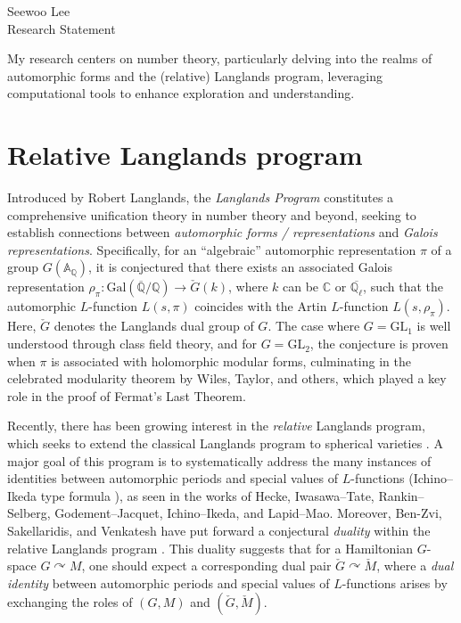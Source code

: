 \documentclass[12pt]{article}
\begin{document}
\noindent Seewoo Lee \\
Research Statement \\
\bigskip



My research centers on number theory, particularly delving into the realms of automorphic forms and the (relative) Langlands program, leveraging computational tools to enhance exploration and understanding.


\section*{Relative Langlands program}

Introduced by Robert Langlands, the \emph{Langlands Program} constitutes a comprehensive unification theory in number theory and beyond, seeking to establish connections between \emph{automorphic forms / representations} and \emph{Galois representations}.
Specifically, for an ``algebraic'' automorphic representation $\pi$ of a group $G(\mathbb{A}_{\mathbb{Q}})$, it is conjectured that there exists an associated Galois representation $\rho_{\pi}: \mathrm{Gal}(\overline{\mathbb{Q}} / \mathbb{Q}) \to \check{G}(k)$, where $k$ can be $\mathbb{C}$ or $\overline{\mathbb{Q}_{\ell}}$, such that the automorphic $L$-function $L(s, \pi)$ coincides with the Artin $L$-function $L(s, \rho_{\pi})$. Here, $\check{G}$ denotes the Langlands dual group of $G$. The case where $G = \mathrm{GL}_{1}$ is well understood through class field theory, and for $G = \mathrm{GL}_{2}$, the conjecture is proven when $\pi$ is associated with holomorphic modular forms, culminating in the celebrated modularity theorem by Wiles, Taylor, and others, which played a key role in the proof of Fermat’s Last Theorem.

Recently, there has been growing interest in the \emph{relative} Langlands program, which seeks to extend the classical Langlands program to spherical varieties \cite{sakellaridis2012spherical,sakellaridis2017periods}.
A major goal of this program is to systematically address the many instances of identities between automorphic periods and special values of $L$-functions (Ichino--Ikeda type formula \cite{ichino2010periods}), as seen in the works of Hecke, Iwasawa--Tate, Rankin--Selberg, Godement--Jacquet, Ichino--Ikeda, and Lapid--Mao. 
Moreover, Ben-Zvi, Sakellaridis, and Venkatesh have put forward a conjectural \emph{duality} within the relative Langlands program \cite{ben2023relative}.
This duality suggests that for a Hamiltonian $G$-space $G \curvearrowright M$, one should expect a corresponding dual pair $\check{G} \curvearrowright \check{M}$, where a \emph{dual identity} between automorphic periods and special values of $L$-functions arises by exchanging the roles of $(G, M)$ and $(\check{G}, \check{M})$.
\end{document}
